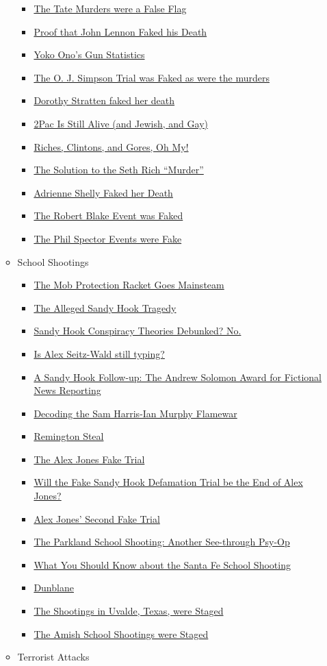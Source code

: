 \documentclass{article}
\newcommand{\insertmydocument}[2]{ %
  \item \href{http://www.mileswmathis.com/#2}{#1}
}
\begin{document}
\begin{itemize}
\begin{itemize}
\begin{itemize}
      \insertmydocument{The Tate Murders were a False Flag}{tate.pdf}
      \insertmydocument{Proof that John Lennon Faked his Death}{lennon.pdf}
      \insertmydocument{Yoko Ono's Gun Statistics}{murder.pdf}
      \insertmydocument{The O. J. Simpson Trial was Faked as were the murders}{oj.pdf}
      \insertmydocument{Dorothy Stratten faked her death}{strat.pdf}
      \insertmydocument{2Pac Is Still Alive (and Jewish, and Gay)}{2pac.pdf}
      \insertmydocument{Riches, Clintons, and Gores, Oh My!}{rich.pdf}
      \insertmydocument{The Solution to the Seth Rich “Murder”}{sethrich.pdf}
      \insertmydocument{Adrienne Shelly Faked her Death}{newnew.pdf}
      \insertmydocument{The Robert Blake Event was Faked}{blake.pdf}
      \insertmydocument{The Phil Spector Events were Fake}{spector.pdf}
    \end{itemize}

    \item School Shootings
    \begin{itemize}

      \insertmydocument{The Mob Protection Racket Goes Mainsteam}{mob.pdf}
      \insertmydocument{The Alleged Sandy Hook Tragedy}{sh.pdf}
      \insertmydocument{Sandy Hook Conspiracy Theories Debunked? No.}{sh3.pdf}
      \insertmydocument{Is Alex Seitz-Wald still typing?}{sh4.pdf}
      \insertmydocument{A Sandy Hook Follow-up: The Andrew Solomon Award for Fictional News Reporting}{sh7.pdf}
      \insertmydocument{Decoding the Sam Harris-Ian Murphy Flamewar}{ian.pdf}
      \insertmydocument{Remington Steal}{remington.pdf}
      \insertmydocument{The Alex Jones Fake Trial}{jones2.pdf}
      \insertmydocument{Will the Fake Sandy Hook Defamation Trial be the End of Alex Jones?}{jones4.pdf}
      \insertmydocument{Alex Jones' Second Fake Trial}{jones3.pdf}
      \insertmydocument{The Parkland School Shooting: Another See-through Psy-Op}{florida.pdf}
      \insertmydocument{What You Should Know about the Santa Fe School Shooting}{santafe.pdf}
      \insertmydocument{Dunblane}{dunblane.pdf}
      \insertmydocument{The Shootings in Uvalde, Texas, were Staged}{uvalde.pdf}
      \insertmydocument{The Amish School Shootings were Staged}{amish.pdf}
    \end{itemize}

    \item Terrorist Attacks
    \begin{itemize}


\end{itemize}
\end{itemize}
\end{itemize}
\end{document}
